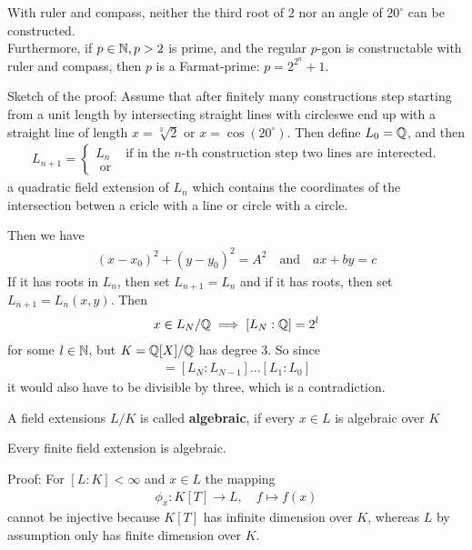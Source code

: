 \begin{corollary}[(Wantzel, 1837)]
With ruler and compass, neither the third root of $2$ nor an angle of $20^{\circ}$ can be constructed.\\
Furthermore, if $p \in \mathbb{N}, p > 2$ is prime, and the regular $p$-gon is constructable with ruler and compass, then $p$ is a Farmat-prime: $p = 2^{2^{n}} + 1$.
\end{corollary}
Sketch of the proof: Assume that after finitely many constructions step starting from a unit length by intersecting straight lines with circleswe end up with a straight line of length $x = \sqrt[3]{2}$ or $x = \cos(20^{\circ})$. Then define $L_0 = \mathbb{Q}$, and then
\begin{align*}
	L_{n+1} = \left\{\begin{array}{ll}
		L_{n} & \text{if in the $n$-th construction step two lines are interected.} \\
		\text{ or }
	\end{array} \right.
\end{align*}
a quadratic field extension of $L_n$ which contains the coordinates of the intersection betwen a cricle with a line or circle with a circle.

Then we have
\begin{align*}
	(x - x_0)^2 + (y - y_0)^2 = A^2 \quad \text{and} \quad ax + by = c
\end{align*}
If it has roots in $L_n$, then set $L_{n+1} = L_n$ and if it has roots, then set $L_{n+1} = L_n(x,y)$. Then
\begin{align*}
	x \in L_N / \mathbb{Q} \implies [L_N:  \mathbb{Q}] = 2^l
\end{align*}
for some $l \in \mathbb{N}$, but $K = \mathbb{Q}[X] /\mathbb{Q}$ has degree $3$.
So since
\begin{align*}
	[L_N:L_0] = [L_N:L_{N-1}] \dots [L_1:L_0]
\end{align*}
it would also have to be divisible by three, which is a contradiction.


\begin{definition}[]
	A field extensions $L/K$ is called \textbf{algebraic}, if every $x \in L$ is algebraic over $K$
\end{definition}
\begin{lemma}[]
	Every finite field extension is algebraic.
\end{lemma}
Proof: For $[L:K] < \infty$ and $x \in L$ the mapping 
\begin{align*}
	\phi_x: K[T] \to L, \quad f \mapsto f(x)
\end{align*}
cannot be injective because $K[T]$ has infinite dimension over $K$, whereas $L$ by assumption only has finite dimension over $K$.


